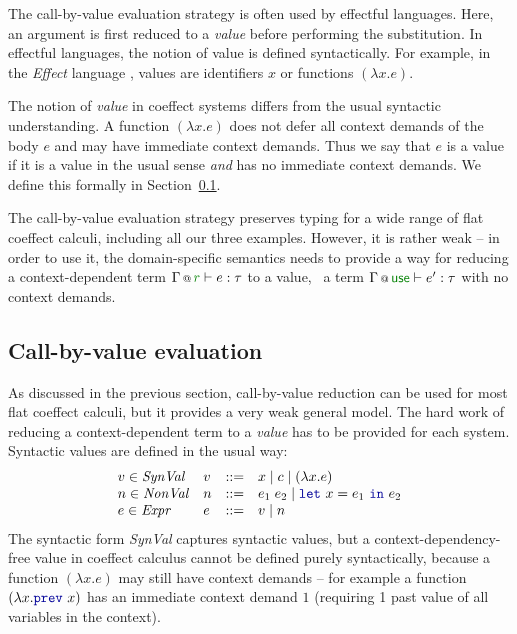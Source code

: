 The call-by-value evaluation strategy is often used by effectful languages. Here, an argument is
first reduced to a \emph{value} before performing the substitution. In effectful languages, the notion
of value is defined syntactically. For example, in the \emph{Effect} language \cite{monads-effects-marriage},
values are identifiers $x$ or functions $(\lambda x.e)$.

The notion of \emph{value} in coeffect systems differs from the usual syntactic understanding.
A function $(\lambda x.e)$ does not defer all context demands of the body $e$ and may have
immediate context demands. Thus we say that $e$ is a value if it is a value in the usual
sense \emph{and} has no immediate context demands. We define this formally in
Section~\ref{sec:flat-syntax-cbv}.

The call-by-value evaluation strategy preserves typing for a wide range of flat coeffect calculi,
including all our three examples. However, it is rather weak -- in order to use it, the domain-specific
semantics needs to provide a way for reducing a context-dependent term $\coctx{\Gamma}{\cclrd{r}} \vdash e : \tau$
to a value, \ie~a term $\coctx{\Gamma}{\cunit} \vdash e' : \tau$ with no context demands.


\subsection{Call-by-value evaluation}
\label{sec:flat-syntax-cbv}

As discussed in the previous section, call-by-value reduction can be used for most flat coeffect
calculi, but it provides a very weak general model. The hard work of reducing a context-dependent
term to a \emph{value} has to be provided for each system. Syntactic values are defined
in the usual way:
%
\begin{equation*}
\begin{array}{llll}
v\in\mathit{SynVal}   & v &::=& x \sep c \sep (\lambda x.e)\\
n\in\mathit{NonVal}   & n &::=& e_1\;e_2 \sep \kvd{let}~x=e_1~\kvd{in}~e_2\\
e\in\mathit{Expr}     & e &::=& v \sep n
\end{array}
\end{equation*}
%
The syntactic form \emph{SynVal} captures syntactic values, but a context-dependency-free value in
coeffect calculus cannot be defined purely syntactically, because a function $(\lambda x.e)$ may
still have context demands -- for example a function $(\lambda x.\kvd{prev}~x)$ has an
immediate context demand $1$ (requiring 1 past value of all variables in the context).

